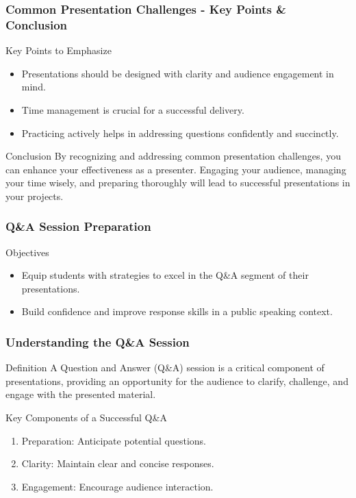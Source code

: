\documentclass[aspectratio=169]{beamer}
\begin{document}
\begin{frame}[fragile]
  \frametitle{Common Presentation Challenges - Key Points & Conclusion}
  \begin{block}{Key Points to Emphasize}
    \begin{itemize}
      \item Presentations should be designed with clarity and audience engagement in mind.
      \item Time management is crucial for a successful delivery.
      \item Practicing actively helps in addressing questions confidently and succinctly.
    \end{itemize}
  \end{block}

  \begin{block}{Conclusion}
    By recognizing and addressing common presentation challenges, you can enhance your effectiveness as a presenter. Engaging your audience, managing your time wisely, and preparing thoroughly will lead to successful presentations in your projects.
  \end{block}
\end{frame}

\begin{frame}[fragile]
    \frametitle{Q\&A Session Preparation}
    \begin{block}{Objectives}
        \begin{itemize}
            \item Equip students with strategies to excel in the Q\&A segment of their presentations.
            \item Build confidence and improve response skills in a public speaking context.
        \end{itemize}
    \end{block}
\end{frame}

\begin{frame}[fragile]
    \frametitle{Understanding the Q\&A Session}
    \begin{block}{Definition}
        A Question and Answer (Q\&A) session is a critical component of presentations, providing an opportunity for the audience to clarify, challenge, and engage with the presented material.
    \end{block}
    
    \begin{block}{Key Components of a Successful Q\&A}
        \begin{enumerate}
            \item Preparation: Anticipate potential questions.
            \item Clarity: Maintain clear and concise responses.
            \item Engagement: Encourage audience interaction.
        \end{enumerate}
    \end{block}
\end{frame}
\end{document}
